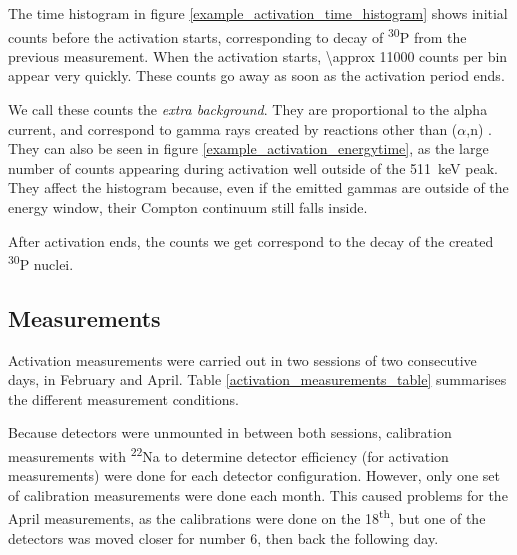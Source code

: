 \documentclass[a4paper,12pt]{report}
\newcommand{\an}{($\alpha$,n) }
\newcommand{\Piso}{\textsuperscript{30}P }
\newcommand{\Na}{\textsuperscript{22}Na }
\begin{document}
The time histogram in figure \ref{example_activation_time_histogram} shows initial counts before the activation starts, corresponding to decay of \Piso from the previous measurement.
When the activation starts, \num{\approx 11000} counts per bin appear very quickly.
These counts go away as soon as the activation period ends.

We call these counts the \textit{extra background}.
They are proportional to the alpha current, and correspond to gamma rays created by reactions other than \an.
They can also be seen in figure \ref{example_activation_energytime}, as the large number of counts appearing during activation well outside of the \qty{511}{\keV} peak.
They affect the histogram because, even if the emitted gammas are outside of the energy window, their Compton continuum still falls inside.

After activation ends, the counts we get correspond to the decay of the created \Piso nuclei.

\subsection{Measurements}
Activation measurements were carried out in two sessions of two consecutive days, in February and April.
Table \ref{activation_measurements_table} summarises the different measurement conditions.

Because detectors were unmounted in between both sessions, calibration measurements with \Na to determine detector efficiency (for activation measurements) were done for each detector configuration.
However, only one set of calibration measurements were done each month.
This caused problems for the April measurements, as the calibrations were done on the 18\textsuperscript{th}, but one of the detectors was moved closer for number 6, then back the following day.
\end{document}
